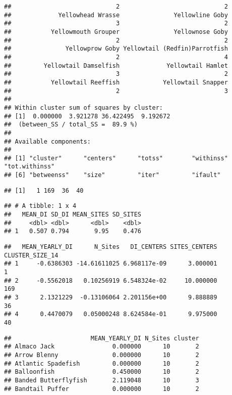 \documentclass[
]{article}
\begin{document}
\begin{verbatim}
##                             2                             2 
##             Yellowhead Wrasse               Yellowline Goby 
##                             3                             2 
##           Yellowmouth Grouper               Yellownose Goby 
##                             2                             2 
##               Yellowprow Goby Yellowtail (Redfin)Parrotfish 
##                             2                             4 
##         Yellowtail Damselfish             Yellowtail Hamlet 
##                             3                             2 
##           Yellowtail Reeffish            Yellowtail Snapper 
##                             2                             3 
## 
## Within cluster sum of squares by cluster:
## [1]  0.000000  3.921278 36.422495  9.192672
##  (between_SS / total_SS =  89.9 %)
## 
## Available components:
## 
## [1] "cluster"      "centers"      "totss"        "withinss"     "tot.withinss"
## [6] "betweenss"    "size"         "iter"         "ifault"
\end{verbatim}

\begin{verbatim}
## [1]   1 169  36  40
\end{verbatim}

\begin{verbatim}
## # A tibble: 1 x 4
##   MEAN_DI SD_DI MEAN_SITES SD_SITES
##     <dbl> <dbl>      <dbl>    <dbl>
## 1   0.507 0.794       9.95    0.476
\end{verbatim}

\begin{verbatim}
##   MEAN_YEARLY_DI      N_Sites   DI_CENTERS SITES_CENTERS CLUSTER_SIZE_14
## 1     -0.6386303 -14.61611025 6.968117e-09      3.000001               1
## 2     -0.5562018   0.10256919 6.548324e-02     10.000000             169
## 3      2.1321229  -0.13106064 2.201156e+00      9.888889              36
## 4      0.4470079   0.05000248 8.624584e-01      9.975000              40
\end{verbatim}

\begin{verbatim}
##                      MEAN_YEARLY_DI N_Sites cluster
## Almaco Jack                0.000000      10       2
## Arrow Blenny               0.000000      10       2
## Atlantic Spadefish         0.000000      10       2
## Balloonfish                0.450000      10       2
## Banded Butterflyfish       2.119048      10       3
## Bandtail Puffer            0.000000      10       2
\end{verbatim}
\end{document}
